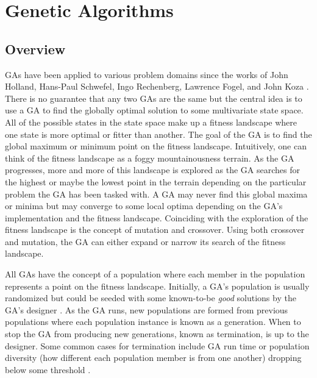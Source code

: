 \chapter{Genetic Algorithms}


\label{Chapter2}

\section{Overview}

GAs have been applied to various problem domains since the works of John Holland, Hans-Paul Schwefel, Ingo Rechenberg, Lawrence Fogel, and John Koza \cite{ColinReeves}\cite{Michalewicz}. There is no guarantee that any two GAs are the same but the central idea is to use a GA to find the globally optimal solution to some multivariate state space. All of the possible states in the state space make up a fitness landscape where one state is more optimal or fitter than another. The goal of the GA is to find the global maximum or minimum point on the fitness landscape. Intuitively, one can think of the fitness landscape as a foggy mountainousness terrain. As the GA progresses, more and more of this landscape is explored as the GA searches for the highest or maybe the lowest point in the terrain depending on the particular problem the GA has been tasked with. A GA may never find this global maxima or minima but may converge to some local optima depending on the GA's implementation and the fitness landscape. Coinciding with the exploration of the fitness landscape is the concept of mutation and crossover. Using both crossover and mutation, the GA can either expand or narrow its search of the fitness landscape. 

All GAs have the concept of a population where each member in the population represents a point on the fitness landscape. Initially, a GA's population is usually randomized but could be seeded with some known-to-be \textit{good} solutions by the GA's designer \cite{DBLP:conf/gem/Diaz-GomezH07}. As the GA runs, new populations are formed from previous populations where each population instance is known as a generation. When to stop the GA from producing new generations, known as termination, is up to the designer. Some common cases for termination include GA run time or population diversity (how different each population member is from one another) dropping below some threshold \cite{ColinReeves}.             

